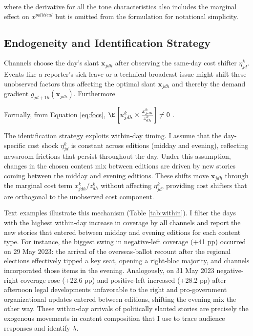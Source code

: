 \documentclass[12pt]{article}
\begin{document}
where the derivative for all the tone characteristics also includes the marginal effect on $x^{political}$ but is omitted from the formulation for notational simplicity. 



\subsection{Endogeneity and Identification Strategy}


Channels choose the day’s slant \(\mathbf{x}_{jdh}\) after observing the same-day cost shifter \(\eta_{jd}^k\). Events like a reporter's sick leave or a technical broadcast issue might shift these unobserved factors  thus affecting the optimal slant \(\mathbf{x}_{jdh}\) and thereby the demand gradient \(g_{jd+1h}(\mathbf{x}_{jdh})\).  Furthermore 

Formally, from Equation \ref{eq:focs},  $\E\left[u_{jdh}^k \times \frac{x_{jdh}^k}{z_{dh}^k}\right]\neq 0$ .




The identification strategy exploits within-day timing. I assume that the day-specific cost shock \(\eta_{jd}^k\) is constant across editions (midday and evening), reflecting newsroom frictions that persist throughout the day. Under this assumption, changes in the chosen content mix between editions are driven by new stories coming between the midday and evening editions. These shifts move \(\bm x_{jdh}\) through the marginal cost term \(x_{jdh}^k / z_{dh}^k\) without affecting \(\eta_{jd}^k\), providing cost shifters that are orthogonal to the unobserved cost component.





Text examples illustrate this mechanism (Table \ref{tab:within}). I filter the days with the highest within-day increase in coverage by all channels and report the new stories that entered between midday and evening editions for each content type. For instance, the biggest swing in negative-left coverage (+41 pp) occurred on 29 May 2023: the arrival of the overseas-ballot recount after the regional elections effectively tipped a key seat, opening a right-bloc majority, and channels incorporated those items in the evening. Analogously, on 31 May 2023 negative-right coverage rose (+22.6 pp) and positive-left increased (+28.2 pp) after afternoon legal developments unfavorable to the right and pro-government organizational updates entered between editions, shifting the evening mix the other way. These within-day arrivals of politically slanted stories are precisely the exogenous movements in content composition that I use to trace audience responses and identify $\lambda$.
\end{document}

